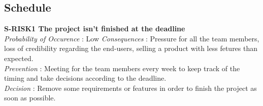 \subsection{Schedule}

	\textbf{ S-RISK1 The project isn't finished at the deadline} \\
	\textit {Probability of Occurence}  : Low
	\textit{Consequences} : Pressure for all the team members, loss of credibility regarding the end-users, selling a product with less fetures than expected.\\
	\textit{Prevention} : Meeting for the team members every week to keep track of the timing and take decisions according to the deadline. \\
	\textit{Decision} : Remove some requirements or features in order to finish the project as soon as possible.\\




